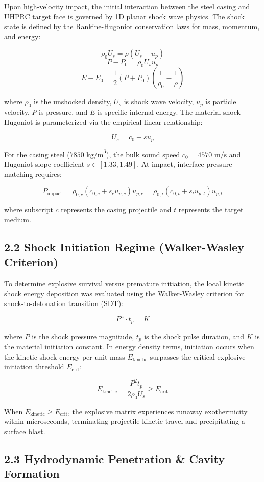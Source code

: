 \documentclass[journal,10pt,twocolumn]{IEEEtran}
\begin{document}
Upon high-velocity impact, the initial interaction between the steel casing and UHPRC target face is governed by 1D planar shock wave physics. The shock state is defined by the Rankine-Hugoniot conservation laws for mass, momentum, and energy:

$$\rho_0 U_s = \rho (U_s - u_p)$$
$$P - P_0 = \rho_0 U_s u_p$$
$$E - E_0 = \frac{1}{2} (P + P_0) \left(\frac{1}{\rho_0} - \frac{1}{\rho}\right)$$

where $\rho_0$ is the unshocked density, $U_s$ is shock wave velocity, $u_p$ is particle velocity, $P$ is pressure, and $E$ is specific internal energy. The material shock Hugoniot is parameterized via the empirical linear relationship:

$$U_s = c_0 + s u_p$$

For the casing steel ($7850\text{ kg/m}^3$), the bulk sound speed $c_0 = 4570\text{ m/s}$ and Hugoniot slope coefficient $s \in [1.33, 1.49]$. At impact, interface pressure matching requires:

$$P_{\text{impact}} = \rho_{0,c} (c_{0,c} + s_c u_{p,c}) u_{p,c} = \rho_{0,t} (c_{0,t} + s_t u_{p,t}) u_{p,t}$$

where subscript $c$ represents the casing projectile and $t$ represents the target medium.

\subsection{2.2 Shock Initiation Regime (Walker-Wasley Criterion)}

To determine explosive survival versus premature initiation, the local kinetic shock energy deposition was evaluated using the Walker-Wasley criterion for shock-to-detonation transition (SDT):

$$P^n \cdot t_p = K$$

where $P$ is the shock pressure magnitude, $t_p$ is the shock pulse duration, and $K$ is the material initiation constant. In energy density terms, initiation occurs when the kinetic shock energy per unit mass $E_{\text{kinetic}}$ surpasses the critical explosive initiation threshold $E_{\text{crit}}$:

$$E_{\text{kinetic}} = \frac{P^2 t_p}{2 \rho_0 U_s} \ge E_{\text{crit}}$$

When $E_{\text{kinetic}} \ge E_{\text{crit}}$, the explosive matrix experiences runaway exothermicity within microseconds, terminating projectile kinetic travel and precipitating a surface blast.

\subsection{2.3 Hydrodynamic Penetration & Cavity Formation}
\end{document}
